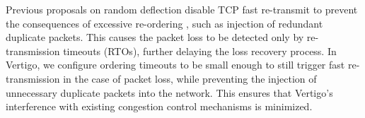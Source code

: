 
Previous proposals on random deflection disable TCP fast re-transmit to prevent the consequences of excessive re-ordering \cite{dibs, pabo}, such as injection of redundant duplicate packets. This causes the packet loss to be detected only by re-transmission timeouts (RTOs), further delaying the loss recovery process. In Vertigo, we configure ordering timeouts to be small enough to still trigger fast re-transmission in the case of packet loss, while preventing the injection of unnecessary duplicate packets into the network. This ensures that Vertigo’s interference with existing congestion control mechanisms is minimized.

